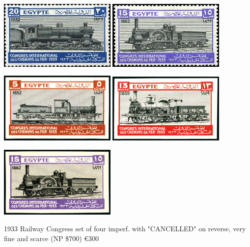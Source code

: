\documentclass[justified]{tufte-book}
\begin{document}
\noindent\includegraphics[width=0.43\textwidth]{./graphics/EG/Scott-170} \includegraphics[width=0.43\textwidth]{./graphics/EG/Scott-171}
\vspace{0pt}
\bigskip
\begin{center}
\includegraphics[width=0.43\textwidth]{./graphics/EG/SG189-cancelled} \includegraphics[width=0.43\textwidth]{./graphics/EG/SG190-cancelled}
\medskip

\noindent\includegraphics[width=0.43\textwidth]{./graphics/EG/SG191-cancelled} 
\end{center}
1933 Railway Congress set of four imperf. with "CANCELLED" on reverse, very fine and scarce (NP \$700) \euro300
\bigskip
\end{document}
